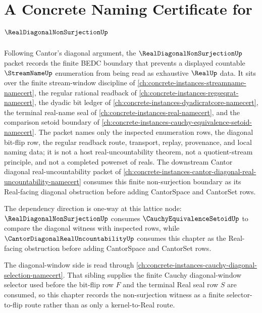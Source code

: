 \chapter{A Concrete Naming Certificate for $\RealDiagonalNonSurjectionUp$}
\label{ch:concrete-instances-real-diagonal-non-surjection-namecert}

Following Cantor's diagonal argument, the $\RealDiagonalNonSurjectionUp$ packet records the finite BEDC boundary that prevents a displayed countable $\StreamNameUp$ enumeration from being read as exhaustive $\RealUp$ data. It sits over the finite stream-window discipline of \autoref{ch:concrete-instances-streamname-namecert}, the regular rational readback of \autoref{ch:concrete-instances-regseqrat-namecert}, the dyadic bit ledger of \autoref{ch:concrete-instances-dyadicratcore-namecert}, the terminal real-name seal of \autoref{ch:concrete-instances-real-namecert}, and the comparison setoid boundary of \autoref{ch:concrete-instances-cauchy-equivalence-setoid-namecert}. The packet names only the inspected enumeration rows, the diagonal bit-flip row, the regular readback route, transport, replay, provenance, and local naming data; it is not a host real-uncountability theorem, not a quotient-stream principle, and not a completed powerset of reals. The downstream Cantor diagonal real-uncountability packet of \autoref{ch:concrete-instances-cantor-diagonal-real-uncountability-namecert} consumes this finite non-surjection boundary as its Real-facing diagonal obstruction before adding CantorSpace and CantorSet rows.

The dependency direction is one-way at this lattice node: $\RealDiagonalNonSurjectionUp$ consumes $\CauchyEquivalenceSetoidUp$ to compare the diagonal witness with inspected rows, while $\CantorDiagonalRealUncountabilityUp$ consumes this chapter as the Real-facing obstruction before adding CantorSpace and CantorSet rows.

The diagonal-window side is read through \autoref{ch:concrete-instances-cauchy-diagonal-selection-namecert}. That sibling supplies the finite Cauchy diagonal-window selector used before the bit-flip row $F$ and the terminal Real seal row $S$ are consumed, so this chapter records the non-surjection witness as a finite selector-to-flip route rather than as only a kernel-to-Real route.

